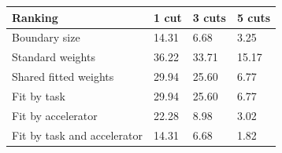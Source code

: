 \begin{tabular}{@{}llll@{}}
\toprule
Ranking & 1 cut & 3 cuts & 5 cuts \\
\midrule
Boundary size & 14.31 & 6.68 & 3.25 \\
Standard weights & 36.22 & 33.71 & 15.17 \\
Shared fitted weights & 29.94 & 25.60 & 6.77 \\
Fit by task & 29.94 & 25.60 & 6.77 \\
Fit by accelerator & 22.28 & 8.98 & 3.02 \\
Fit by task and accelerator & 14.31 & 6.68 & 1.82 \\
\bottomrule
\end{tabular}

